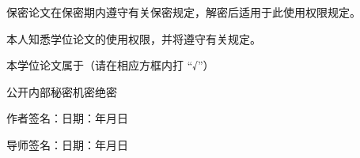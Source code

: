 \vspace{1em}

{\songti{}
\linespread{1.25}\selectfont  %
保密论文在保密期内遵守有关保密规定，解密后适用于此使用权限规定。}

{\songti{}
\linespread{1.25}\selectfont  %
本人知悉学位论文的使用权限，并将遵守有关规定。}

\vspace{2em}

{\songti{}
\linespread{1.25}\selectfont  %
本学位论文属于（请在相应方框内打 “√”）

\noindent
\hspace{1.1cm}\resizebox{1.2em}{!}{$\Square$}公开\hspace{1.7em}\resizebox{1.2em}{!}{$\Square$}内部\hspace{1.7em}\resizebox{1.2em}{!}{$\Square$}秘密\hspace{1.7em}\resizebox{1.2em}{!}{$\Square$}机密\hspace{1.7em}\resizebox{1.2em}{!}{$\Square$}绝密}



\vspace{2em}

{\songti{}
\linespread{1.25}\selectfont 
作者签名：\hspace{6em}\hspace{6em}日期：\hspace{2em}年\hspace{2em}月\hspace{2em}日}

\vspace{2em}

{\songti{}
\linespread{1.25}\selectfont 
导师签名：\hspace{6em}\hspace{6em}日期：\hspace{2em}年\hspace{2em}月\hspace{2em}日}
